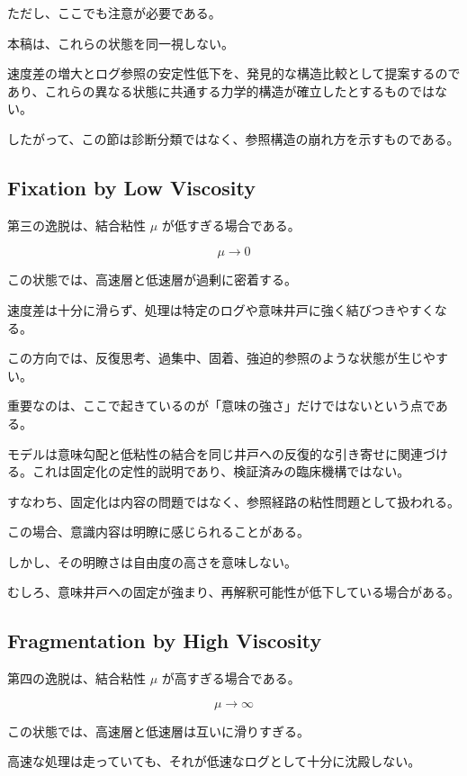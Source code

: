 ただし、ここでも注意が必要である。

本稿は、これらの状態を同一視しない。

速度差の増大とログ参照の安定性低下を、発見的な構造比較として提案するのであり、これらの異なる状態に共通する力学的構造が確立したとするものではない。

したがって、この節は診断分類ではなく、参照構造の崩れ方を示すものである。

\subsection{Fixation by Low Viscosity}

第三の逸脱は、結合粘性 $\mu$ が低すぎる場合である。

\begin{equation}
\mu \rightarrow 0
\end{equation}

この状態では、高速層と低速層が過剰に密着する。

速度差は十分に滑らず、処理は特定のログや意味井戸に強く結びつきやすくなる。

この方向では、反復思考、過集中、固着、強迫的参照のような状態が生じやすい。

重要なのは、ここで起きているのが「意味の強さ」だけではないという点である。

モデルは意味勾配と低粘性の結合を同じ井戸への反復的な引き寄せに関連づける。これは固定化の定性的説明であり、検証済みの臨床機構ではない。

すなわち、固定化は内容の問題ではなく、参照経路の粘性問題として扱われる。

この場合、意識内容は明瞭に感じられることがある。

しかし、その明瞭さは自由度の高さを意味しない。

むしろ、意味井戸への固定が強まり、再解釈可能性が低下している場合がある。

\subsection{Fragmentation by High Viscosity}

第四の逸脱は、結合粘性 $\mu$ が高すぎる場合である。

\begin{equation}
\mu \rightarrow \infty
\end{equation}

この状態では、高速層と低速層は互いに滑りすぎる。

高速な処理は走っていても、それが低速なログとして十分に沈殿しない。

